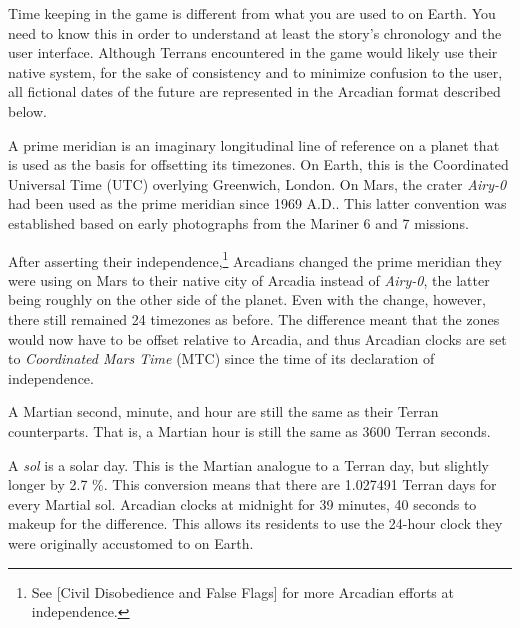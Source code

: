 

Time keeping in the game is different from what you are used to on Earth. You need to know this in order to understand at least the story's chronology and the user interface. Although Terrans encountered in the game would likely use their native system, for the sake of consistency and to minimize confusion to the user, all fictional dates of the future are represented in the Arcadian format described below.


A prime meridian is an imaginary longitudinal line of reference on a planet that is used as the basis for offsetting its timezones. On Earth, this is the Coordinated Universal Time (UTC) overlying Greenwich, London. On Mars, the crater {\it Airy-0} had been used as the prime meridian since 1969 A.D.. This latter convention was established based on early photographs from the Mariner 6 and 7 missions.

After asserting their independence,\footnote{See [Civil Disobedience and False Flags] for more Arcadian efforts at independence.} Arcadians changed the prime meridian they were using on Mars to their native city of Arcadia instead of {\it Airy-0}, the latter being roughly on the other side of the planet. Even with the change, however, there still remained 24 timezones as before. The difference meant that the zones would now have to be offset relative to Arcadia, and thus Arcadian clocks are set to {\it Coordinated Mars Time} (MTC) since the time of its declaration of independence.


A Martian second, minute, and hour are still the same as their Terran counterparts. That is, a Martian hour is still the same as 3600 Terran seconds.

A {\it sol} is a solar day. This is the Martian analogue to a Terran day, but slightly longer by 2.7 \%. This conversion means that there are 1.027491 Terran days for every Martial sol. Arcadian clocks  at midnight for 39 minutes, 40 seconds to makeup for the difference. This allows its residents to use the 24-hour clock they were originally accustomed to on Earth.

